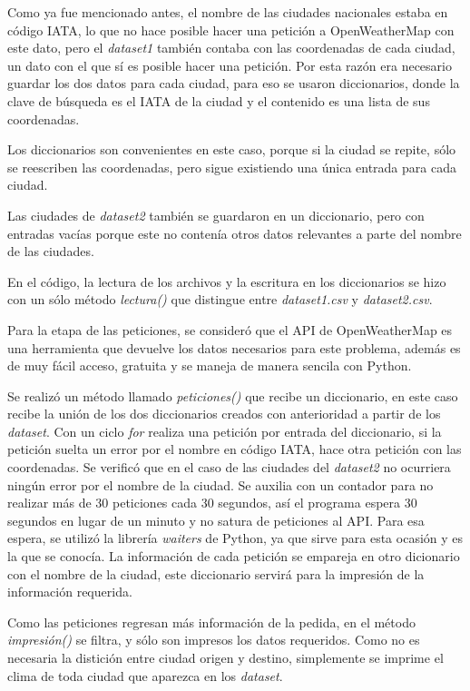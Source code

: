 \documentclass[]{article}
\begin{document}
Como ya fue mencionado antes, el nombre de las ciudades nacionales estaba 
en código IATA, lo que no hace posible hacer una petición a 
OpenWeatherMap con este dato, pero el \emph{dataset1} también contaba 
con las coordenadas de cada ciudad, un dato con el que sí es posible hacer 
una petición. Por esta razón era necesario guardar los dos datos para cada 
ciudad, para eso se usaron diccionarios, donde la clave de búsqueda es el 
IATA de la ciudad y el contenido es una lista de sus coordenadas.

Los diccionarios son convenientes en este caso, porque si la ciudad se repite, 
sólo se reescriben las coordenadas, pero sigue existiendo una única entrada 
para cada ciudad.

Las ciudades de \emph{dataset2} también se guardaron en un diccionario, 
pero con entradas vacías porque este no contenía otros datos relevantes a 
parte del nombre de las ciudades.

En el código, la lectura de los archivos y la escritura en los diccionarios se 
hizo con un sólo método \emph{lectura()} que distingue entre
\emph{dataset1.csv} y \emph{dataset2.csv}.

Para la etapa de las peticiones, se consideró que el API de OpenWeatherMap 
es una herramienta que devuelve los datos necesarios para este problema, 
además es de muy fácil acceso, gratuita y se maneja de manera sencila con 
Python.

Se realizó un método llamado \emph{peticiones()} que recibe un diccionario, 
en este caso recibe la unión de los dos diccionarios creados con anterioridad 
a partir de los \emph{dataset}. Con un ciclo \emph{for} realiza una petición 
por entrada del diccionario, si la petición suelta un error por el nombre en 
código IATA, hace otra petición con las coordenadas. Se verificó que en el 
caso de las ciudades del \emph{dataset2} no ocurriera ningún error por el 
nombre de la ciudad. Se auxilia con un contador para no realizar más de 30 
peticiones cada 30 segundos, así el programa espera 30 segundos en lugar 
de un minuto y no satura de peticiones al API. Para esa espera, se utilizó la 
librería \emph{waiters} de Python, ya que sirve para esta ocasión y es la que 
se conocía. La información de cada petición se empareja en otro dicionario 
con el nombre de la ciudad, este diccionario servirá para la impresión de la 
información requerida.

Como las peticiones regresan más información de la pedida, en el método
\emph{impresión()} se filtra, y sólo son impresos los datos requeridos. Como 
no es necesaria la distición entre ciudad origen y destino, simplemente se 
imprime el clima de toda ciudad que aparezca en los \emph{dataset}.
\end{document}
